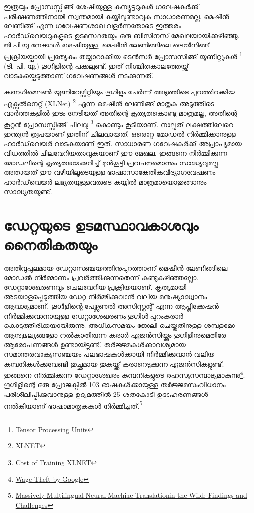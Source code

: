 \documentclass[12pt,twoside,a4paper]{article}
\begin{document}
ഇത്രയും പ്രോസസ്സിങ്ങ് ശേഷിയുള്ള കമ്പ്യൂട്ടറുകൾ ഗവേഷകർക്ക് പരീക്ഷണത്തിനായി സ്വന്തമായി കയ്യിലുണ്ടാവുക സാധാരണമല്ല. മെഷീൻ ലേണിങ്ങ് എന്ന ഗവേഷണശാഖ വളർന്നതോടെ ഇത്തരം ഹാർഡ്‌വെയറുകളുടെ ഉടമസ്ഥതയും ഒരു ബിസിനസ് മേഖലയായിക്കഴിഞ്ഞു. ജി.പി.യു.നേക്കാൾ ശേഷിയുള്ള, മെഷീൻ ലേണിങ്ങിലെ ട്രെയിനിങ്ങ് പ്രക്രിയയ്ക്കായി പ്രത്യേകം തയ്യാറാക്കിയ ടെൻസർ പ്രോസസിങ്ങ് യൂണിറ്റുകൾ \footnote{ \href{https://cloud.google.com/tpu/}{Tensor Processing Units} } (ടി. പി. യു.) ഗൂഗിളിന്റെ പക്കലുണ്ട്. ഇത് നിശ്ചിതകാലത്തേയ്ക്ക് വാടകയ്ക്കെടുത്താണ് ഗവേഷണങ്ങൾ നടക്കുന്നത്. 

കണഗിമെലൺ യൂണിവേഴ്സിറ്റിയും ഗൂഗിളും ചേർന്ന് അടുത്തിടെ പുറത്തിറക്കിയ എക്സൽനെറ്റ് (XLNet) \footnote{\href{https://medium.com/syncedreview/cmu-google-xlnet-tops-bert-achieves-sota-results-on-18-nlp-tasks-66f7022f34f5}{XLNET}} എന്ന മെഷീൻ ലേണിങ്ങ് മാതൃക അടുത്തിടെ വാർത്തകളിൽ ഇടം നേടിയത് അതിന്റെ കൃത്യതകൊണ്ടു മാത്രമല്ല, അതിന്റെ കൂറ്റൻ പ്രോസസ്സിങ്ങ്  ചിലവു \footnote{\href{https://medium.com/syncedreview/the-staggering-cost-of-training-sota-ai-models-e329e80fa82}{Cost of Training XLNET}} കൊണ്ടും കൂടിയാണ്. നാല്പത് ലക്ഷത്തിലേറെ ഇന്ത്യൻ രൂപയാണ് ഇതിന് ചിലവായത്. ഒരൊറ്റ മോഡൽ നിർമ്മിക്കാനുള്ള ഹാർഡ്‌വെയർ വാടകയാണ് ഇത്. സാധാരണ ഗവേഷകർക്ക് അപ്രാപ്യമായ വിധത്തിൽ ചിലവേറിയതാവുകയാണ് ഈ മേഖല. ഇങ്ങനെ നിർമ്മിക്കുന്ന മോഡലിന്റെ കൃത്യതയെക്കുറിച്ച് മുൻകൂട്ടി പ്രവചനമൊന്നും സാദ്ധ്യവുമല്ല. അതായത് ഈ വഴിയിലൂടെയുള്ള ഭാഷാസാങ്കേതികവിദ്യാഗവേഷണം ഹാർഡ്‌വെയർ ലഭ്യതയുള്ളവരുടെ കയ്യിൽ മാത്രമായൊതുങ്ങാനും സാദ്ധ്യതയുണ്ട്.


\section{ഡേറ്റയുടെ ഉടമസ്ഥാവകാശവും നൈതികതയും}

അതിവുപുലമായ ഡേറ്റാസഞ്ചയത്തിനുപുറത്താണ്  മെഷീൻ ലേണിങ്ങിലെ മോഡൽ നിർമ്മാണം പ്രവർത്തിക്കുന്നതെന്ന് കണ്ടുകഴിഞ്ഞല്ലോ. ഡേറ്റാശേഖരണവും ചെലവേറിയ പ്രക്രിയയാണ്. കൃത്യമായി അടയാളപ്പെടുത്തിയ ഡേറ്റ നിർമ്മിക്കുവാൻ വലിയ മനുഷ്യാദ്ധ്വാനം ആവശ്യമാണ്. ഗൂഗിളിന്റെ പേഴ്സണൽ അസിസ്റ്റന്റ് എന്ന ആപ്ലിക്കേഷൻ നിർമ്മിക്കുവാനായുള്ള ഡേറ്റാശേഖരണം ഗൂഗിൾ പുറംകരാർ കൊടുത്തിരിക്കയായിരുന്നു. അധികസമയം ജോലി ചെയ്തതിനുള്ള ശമ്പളമോ ആനുകൂല്യങ്ങളോ നൽകാതിരുന്ന കരാർ ഏജൻസിയ്ക്കും ഗൂഗിളിനുമെതിരേ ആരോപണങ്ങൾ ഉണ്ടായിട്ടുണ്ട്. തർജ്ജമകൾക്കാവശ്യമായ സമാന്തരവാക്യസഞ്ചയം പലഭാഷകൾക്കായി നിർമ്മിക്കുവാൻ  വലിയ കമ്പനികൾക്കുവേണ്ടി  തുച്ഛമായ തുകയ്ക്ക് കരാറെടുക്കുന്ന ഏജൻസികളുണ്ട്. ഇങ്ങനെ നിർമ്മിക്കുന്ന ഡേറ്റാശേഖരം കമ്പനികളുടെ രഹസ്യസമ്പാദ്യമാകുന്നു\footnote{\href{https://boingboing.net/2019/06/03/wage-theft-2.html}{Wage Theft by Google}}.  ഗൂഗിളിന്റെ ഒരു പ്രോജക്ടിൽ 103 ഭാഷകൾക്കായുള്ള തർജ്ജമസംവിധാനം പരിശീലിപ്പിക്കുവാനുള്ള ഉദ്യമത്തിൽ 25 ശതകോടി ഉദാഹരണങ്ങൾ നൽകിയാണ് ഭാഷാമാതൃകകൾ നിർമ്മിച്ചത്.\footnote{\href{https://arxiv.org/pdf/1907.05019.pdf}{Massively Multilingual Neural Machine Translationin the Wild: Findings and Challenges}}
\end{document}
